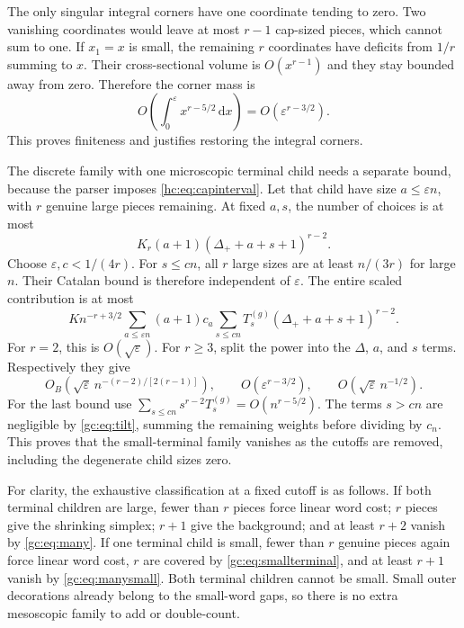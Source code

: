 \documentclass[11pt,a4paper]{article}
\theoremstyle{definition}\newaliascnt{definition}{theorem}
\theoremstyle{remark}\newaliascnt{remark}{theorem}
\newcommand{\dd}{\mathrm d}
\begin{document}
The only singular integral corners have one coordinate tending to zero. Two
vanishing coordinates would leave at most $r-1$ cap-sized pieces, which cannot
sum to one. If $x_1=x$ is small, the remaining $r$ coordinates have deficits
from $1/r$ summing to $x$. Their cross-sectional volume is $O(x^{r-1})$ and they
stay bounded away from zero. Therefore the corner mass is
\begin{equation}\label{gc:eq:corner}
 O\!\left(\int_0^\varepsilon x^{r-5/2}\,\dd x\right)
 =O(\varepsilon^{r-3/2}).
\end{equation}
This proves finiteness and justifies restoring the integral corners.

The discrete family with one microscopic terminal child needs a separate bound,
because the parser imposes \eqref{hc:eq:capinterval}. Let that child have size
$a\le\varepsilon n$, with $r$ genuine large pieces remaining. At fixed $a,s$,
the number of choices is at most
\[
 K_r(a+1)(\Delta_++a+s+1)^{r-2}.
\]
Choose $\varepsilon,c<1/(4r)$. For $s\le cn$, all $r$ large sizes are at least
$n/(3r)$ for large $n$. Their Catalan bound is therefore independent of
$\varepsilon$. The entire scaled contribution is at most
\begin{equation}\label{gc:eq:smallterminal}
 K n^{-r+3/2}\sum_{a\le\varepsilon n}(a+1)c_a
            \sum_{s\le cn}T^{(g)}_s(\Delta_++a+s+1)^{r-2}.
\end{equation}
For $r=2$, this is $O(\sqrt\varepsilon)$. For $r\ge3$, split the power into
the $\Delta$, $a$, and $s$ terms. Respectively they give
\[
 O_B\!\left(\sqrt\varepsilon\,
              n^{-(r-2)/[2(r-1)]}\right),\qquad
 O(\varepsilon^{r-3/2}),\qquad
 O(\sqrt\varepsilon\,n^{-1/2}).
\]
For the last bound use
$\sum_{s\le cn}s^{r-2}T^{(g)}_s=O(n^{r-5/2})$.
The terms $s>cn$ are negligible by \eqref{gc:eq:tilt}, summing the remaining
weights before dividing by $c_n$. This proves that the small-terminal family
vanishes as the cutoffs are removed, including the degenerate child sizes zero.

For clarity, the exhaustive classification at a fixed cutoff is as follows. If
both terminal children are large, fewer than $r$ pieces force linear word cost;
$r$ pieces give the shrinking simplex; $r+1$ give the background; and at least
$r+2$ vanish by \eqref{gc:eq:many}. If one terminal child is small, fewer than
$r$ genuine pieces again force linear word cost, $r$ are covered by
\eqref{gc:eq:smallterminal}, and at least $r+1$ vanish by
\eqref{gc:eq:manysmall}. Both terminal children cannot be small. Small outer
decorations already belong to the small-word gaps, so there is no extra
mesoscopic family to add or double-count.
\end{document}

